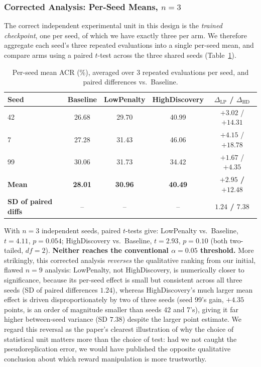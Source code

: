 \documentclass[11pt]{article}
\begin{document}
\subsubsection{Corrected Analysis: Per-Seed Means, \texorpdfstring{$n=3$}{n=3}}
\label{sec:corrected-stats}
The correct independent experimental unit in this design is the
\emph{trained checkpoint}, one per seed, of which we have exactly three
per arm. We therefore aggregate each seed's three repeated evaluations
into a single per-seed mean, and compare arms using a paired $t$-test
across the three shared seeds (Table~\ref{tab:paired}).

\begin{table}[h]
\centering
\small
\caption{Per-seed mean ACR (\%), averaged over 3 repeated evaluations per seed, and paired differences vs.\ Baseline.}
\label{tab:paired}
\begin{tabular}{lcccc}
\toprule
Seed & Baseline & LowPenalty & HighDiscovery & $\Delta_{\text{LP}}$ / $\Delta_{\text{HD}}$ \\
\midrule
42 & 26.68 & 29.70 & 40.99 & $+3.02$ / $+14.31$ \\
7  & 27.28 & 31.43 & 46.06 & $+4.15$ / $+18.78$ \\
99 & 30.06 & 31.73 & 34.42 & $+1.67$ / $+4.35$ \\
\midrule
\textbf{Mean} & \textbf{28.01} & \textbf{30.96} & \textbf{40.49} & \textbf{$+2.95$ / $+12.48$} \\
\textbf{SD of paired diffs} & -- & -- & -- & \textbf{$1.24$ / $7.38$} \\
\bottomrule
\end{tabular}
\end{table}

With $n=3$ independent seeds, paired $t$-tests give: LowPenalty vs.\
Baseline, $t=4.11$, $p=0.054$; HighDiscovery vs.\ Baseline, $t=2.93$,
$p=0.10$ (both two-tailed, $df=2$). \textbf{Neither reaches the
conventional $\alpha=0.05$ threshold.} More strikingly, this corrected
analysis \emph{reverses} the qualitative ranking from our initial,
flawed $n=9$ analysis: LowPenalty, not HighDiscovery, is numerically
closer to significance, because its per-seed effect is small but
consistent across all three seeds (SD of paired differences $1.24$),
whereas HighDiscovery's much larger mean effect is driven
disproportionately by two of three seeds (seed 99's gain, $+4.35$ points,
is an order of magnitude smaller than seeds 42 and 7's), giving it far
higher between-seed variance (SD $7.38$) despite the larger point
estimate. We regard this reversal as the paper's clearest illustration of
why the choice of statistical unit matters more than the choice of test:
had we not caught the pseudoreplication error, we would have published
the opposite qualitative conclusion about which reward manipulation is
more trustworthy.
\end{document}
